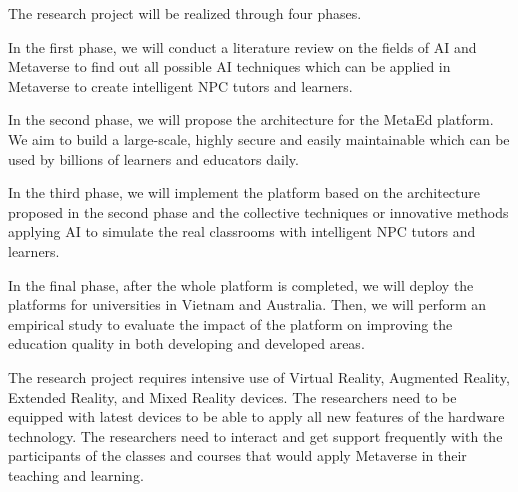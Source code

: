 \documentclass[
    ngerman,american
    ]{scrartcl}
\begin{document}
    	\sectionMethod
	The research project will be realized through four phases.
	\begin{description}{}
	\item [\phaseOne] 
	In the first phase, we will conduct a literature review on the fields of AI and Metaverse to find out all possible AI techniques
	which can be applied in Metaverse to create intelligent NPC tutors and learners.
	
	\item [\phaseTwo]
	In the second phase, we will propose the architecture for the MetaEd platform. We aim to build a large-scale, highly secure 
	and easily maintainable which can be used by billions of learners and educators daily.  
	
	\item [\phaseThree]
	In the third phase, we will implement the platform based on the architecture proposed in the second phase and the collective techniques 
	or innovative methods applying AI to simulate the real classrooms with intelligent NPC tutors and learners.
	
	\item [\phaseFour]
	In the final phase, after the whole platform is completed, we will deploy the platforms for universities in Vietnam and Australia.
	Then, we will perform an empirical study to evaluate the impact of the platform on improving the education quality in both developing
	and developed areas. 
	
	\end{description}{}	
	
	
	\sectionResources
	The research project requires intensive use of Virtual Reality, Augmented Reality, Extended Reality, and Mixed Reality devices. 
	The researchers need to be equipped with latest devices to be able to apply all new features of the hardware technology. 
	The researchers need to interact and get support frequently 
	with the participants of the classes and courses that would apply Metaverse in their teaching and learning.
      

        \sectionSource
        
\end{document}
